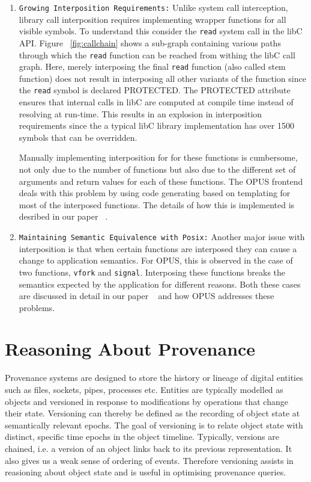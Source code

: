 \documentclass[withindex,glossary]{cam-thesis}
\begin{document}
\begin{enumerate}
\item \texttt{Growing Interposition Requirements:} Unlike system call interception, library call interposition requires implementing wrapper functions for all visible symbols. To understand this consider the \texttt{read} system call in the libC API. Figure ~\ref{fig:callchain} shows a sub-graph containing various paths through which the \texttt{read} function can be reached from withing the libC call graph. 
Here, merely interposing the final \texttt{read} function (also called stem function) does not result in interposing all other variants of the function since the \texttt{read} symbol is declared PROTECTED. The PROTECTED attribute ensures that internal calls in libC are computed at compile time instead of resolving at run-time.
This results in an explosion in interposition requirements since the a typical libC library implementation has over 1500 symbols that can be overridden. 

Manually implementing interposition for for these functions is cumbersome, not only due to the number of functions but also due to the different set of arguments and return values for each of these functions. The OPUS frontend deals with this problem by using code generating based on templating for most of the interposed functions. The details of how this is implemented is desribed in our paper ~\cite{OPUSLessons}.

\item \texttt{Maintaining Semantic Equivalence with Posix:} Another major issue with interposition is that when certain functions are interposed they can cause a change to application semantics. For OPUS, this is observed in the case of two functions, \texttt{vfork} and \texttt{signal}. Interposing these functions breaks the semantics expected by the application for different reasons. Both these cases are discussed in detail in our paper ~\cite{OPUSLessons} and how OPUS addresses these problems.

\end{enumerate}



\section{Reasoning About Provenance}
Provenance systems are designed to store the history or lineage of digital entities such as files, sockets, pipes, processes etc.
Entities are typically modelled as objects and versioned in response to modifications by operations that change their state.
Versioning can thereby be defined as the recording of object state at semantically relevant epochs.
The goal of versioning is to relate object state with distinct, specific time epochs in the object timeline.
Typically, versions are chained, i.e. a version of an object links back to its previous representation.
It also gives us a weak sense of ordering of events.
Therefore versioning assists in reasioning about object state and is useful in optimising provenance queries.
\end{document}
